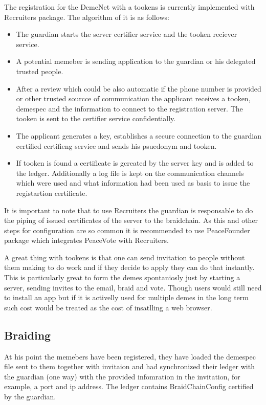 \documentclass{article}
\begin{document}
The registration for the DemeNet with a tookens is currently implemented with Recruiters package. The algorithm of it is as follows:
\begin{itemize}
  \item The guardian starts the server certifier service and the tooken reciever service.
  \item A potential memeber is sending application to the guardian or his delegated trusted people.
  \item After a review which could be also automatic if the phone number is provided or other trusted sourcce of communication the applicant receives a tooken, demespec and the information to connect to the registration server. The tooken is sent to the certifier service confidentially.
  \item The applicant generates a key, establishes a secure connection to the guardian certified certifieng service and sends his psuedonym and tooken. 
  \item If tooken is found a certificate is gcreated by the server key and is added to the ledger. Additionally a log file is kept on the communication channels which were used and what information had been used as basis to issue the registartion certificate.
  \end{itemize}
It is important to note that to use Recruiters the guardian is responsable to do the piping of issued certificates of the server to the braidchain. As this and other steps for configuration are so common it is recommended to use PeaceFounder package which integrates PeaceVote with Recruiters.
  
A great thing with tookens is that one can send invitation to people without them making to do work and if they decide to apply they can do that instantly. This is particularly great to form the demes spontaniosly just by starting a server, sending invites to the email, braid and vote. Though users would still need to install an app but if it is activelly used for multiple demes in the long term such cost would be treated as the cost of insatlling a web browser.

\subsection{Braiding}

At his point the memebers have been registered, they have loaded the demespec file sent to them together with invitaion and had synchronized their ledger with the guardian (one way) with the provided infomration in the invitation, for example, a port and ip address. The ledger contains BraidChainConfig certified by the guardian.
\end{document}
